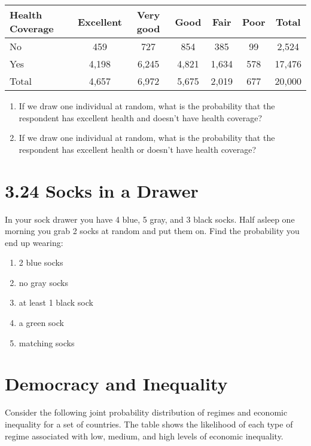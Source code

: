 \documentclass{article}
\begin{document}
\begin{table}[H]
\centering
\settowidth{}
\setlength\extrarowheight{2pt}
\begin{tabulary}{\linewidth}{|L|C|C|C|C|C|C|}
\hline
\textbf{Health Coverage} & \textbf{Excellent} & \textbf{Very good} & \textbf{Good} & \textbf{Fair} & \textbf{Poor} & \textbf{Total} \\
\hline
No & 459 & 727 & 854 & 385 & 99 & 2,524 \\
Yes & 4,198 & 6,245 & 4,821 & 1,634 & 578 & 17,476 \\
\hline
Total & 4,657 & 6,972 & 5,675 & 2,019 & 677 & 20,000 \\
\hline
\end{tabulary}
\end{table}

\begin{enumerate}
    \item[(a)] If we draw one individual at random, what is the probability that the respondent has excellent health and doesn’t have health coverage?
    \item[(b)] If we draw one individual at random, what is the probability that the respondent has excellent health or doesn’t have health coverage?
\end{enumerate}

\section*{3.24 Socks in a Drawer}
In your sock drawer you have 4 blue, 5 gray, and 3 black socks. Half asleep one morning you grab 2 socks at random and put them on. Find the probability you end up wearing:
\begin{enumerate}
    \item[(a)] 2 blue socks
    \item[(b)] no gray socks
    \item[(c)] at least 1 black sock
    \item[(d)] a green sock
    \item[(e)] matching socks
\end{enumerate}

\section*{Democracy and Inequality}

Consider the following joint probability distribution of regimes and economic inequality for a set of countries. The table shows the likelihood of each type of regime associated with low, medium, and high levels of economic inequality.
\end{document}
